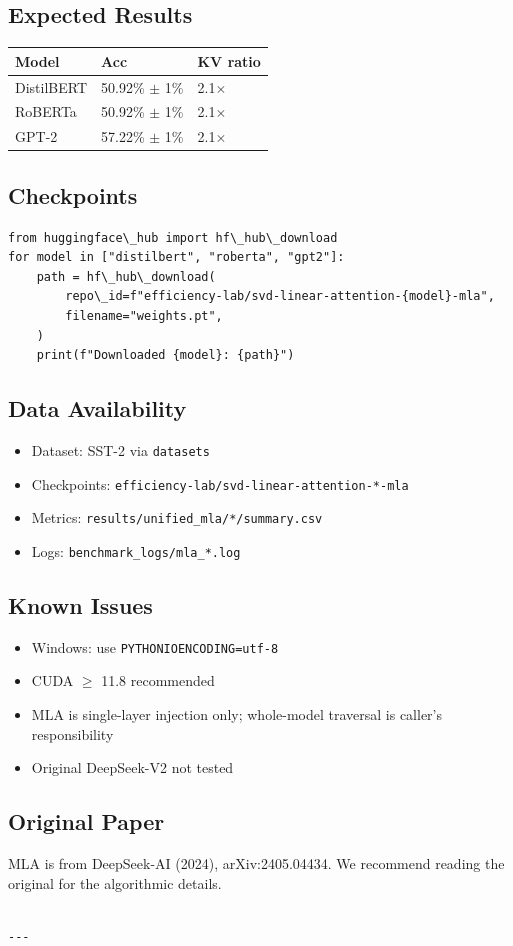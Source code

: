 \subsection{Expected Results}

\begin{table}[H]
\centering
\small
\begin{tabular}{lll}
\toprule
\textbf{Model} & \textbf{Acc} & \textbf{KV ratio} \\
\midrule
DistilBERT & 50.92\% $\pm$ 1\% & 2.1$\times$ \\
RoBERTa & 50.92\% $\pm$ 1\% & 2.1$\times$ \\
GPT-2 & 57.22\% $\pm$ 1\% & 2.1$\times$ \\
\bottomrule
\end{tabular}
\end{table}

\subsection{Checkpoints}

\begin{lstlisting}
from huggingface\_hub import hf\_hub\_download
for model in ["distilbert", "roberta", "gpt2"]:
    path = hf\_hub\_download(
        repo\_id=f"efficiency-lab/svd-linear-attention-{model}-mla",
        filename="weights.pt",
    )
    print(f"Downloaded {model}: {path}")
\end{lstlisting}

\subsection{Data Availability}

\begin{itemize}
\item Dataset: SST-2 via \texttt{datasets}
\item Checkpoints: \texttt{efficiency-lab/svd-linear-attention-*-mla}
\item Metrics: \texttt{results/unified\_mla/*/summary.csv}
\item Logs: \texttt{benchmark\_logs/mla\_*.log}

\end{itemize}
\subsection{Known Issues}

\begin{itemize}
\item Windows: use \texttt{PYTHONIOENCODING=utf-8}
\item CUDA $\ge$ 11.8 recommended
\item MLA is single-layer injection only; whole-model traversal is caller's
  responsibility
\item Original DeepSeek-V2 not tested

\end{itemize}
\subsection{Original Paper}

MLA is from DeepSeek-AI (2024), arXiv:2405.04434. We recommend reading 
the original for the algorithmic details.
\begin{lstlisting}

---
\end{lstlisting}